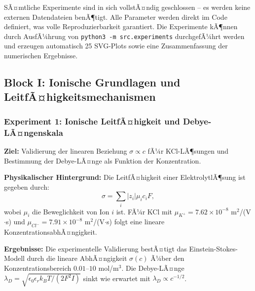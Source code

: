 ﻿\documentclass[a4paper,12pt]{scrreprt}
\theoremstyle{definition}
\begin{document}
SÃ¤mtliche Experimente sind in sich vollstÃ¤ndig geschlossen -- es werden keine externen Datendateien benÃ¶tigt. Alle Parameter werden direkt im Code definiert, was volle Reproduzierbarkeit garantiert. Die Experimente kÃ¶nnen durch AusfÃ¼hrung von \texttt{python3 -m src.experiments} durchgefÃ¼hrt werden und erzeugen automatisch 25 SVG-Plots sowie eine Zusammenfassung der numerischen Ergebnisse.


\subsection{Block I: Ionische Grundlagen und LeitfÃ¤higkeitsmechanismen}

\subsubsection{Experiment 1: Ionische LeitfÃ¤higkeit und Debye-LÃ¤ngenskala}

\textbf{Ziel:} Validierung der linearen Beziehung $\sigma \propto c$ fÃ¼r KCl-LÃ¶sungen und Bestimmung der Debye-LÃ¤nge als Funktion der Konzentration.

\textbf{Physikalischer Hintergrund:} Die LeitfÃ¤higkeit einer ElektrolytlÃ¶sung ist gegeben durch:
\begin{equation}
	\sigma = \sum_i |z_i| \mu_i c_i F,
\end{equation}
wobei $\mu_i$ die Beweglichkeit von Ion $i$ ist. FÃ¼r KCl mit $\mu_{K^+} = 7.62 \times 10^{-8}$ m$^2$/(V$\cdot$s) und $\mu_{Cl^-} = 7.91 \times 10^{-8}$ m$^2$/(V$\cdot$s) folgt eine lineare KonzentrationsabhÃ¤ngigkeit.

\textbf{Ergebnisse:} Die experimentelle Validierung bestÃ¤tigt das Einstein-Stokes-Modell durch die lineare AbhÃ¤ngigkeit $\sigma(c)$ Ã¼ber den Konzentrationsbereich $0.01$--$10$ mol/m$^3$. Die Debye-LÃ¤nge $\lambda_D = \sqrt{\epsilon_0 \epsilon_r k_B T / (2 F^2 I)}$ sinkt wie erwartet mit $\lambda_D \propto c^{-1/2}$.
\end{document}
